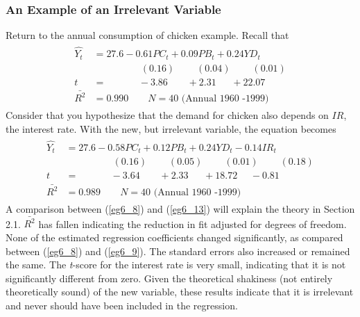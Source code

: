 \documentclass[11pt]{article}
\begin{document}
\subsubsection{An Example of an Irrelevant Variable}
Return to the annual consumption of chicken example. Recall that
\begin{align*}
\begin{split}
\hat{Y_t} &= 27.6 - {0.61PC_t} + {0.09PB_t} + {0.24YD_t}\\
&\>\>\>\>\>\>\>\>\>\>\>\>\>\>\>\>\>\>\>\>\>\> (0.16) 
\>\>\>\>\>\>\>\>\>\> (0.04)
\>\>\>\>\>\>\>\>\>\> (0.01)\\
t&=\>\>\>\>\>\>\>\>\>\>\>\>\>\>\> -3.86 
\>\>\>\>\>\>\>\>\> +2.31
\>\>\>\>\>\>\> +22.07\\
\bar{R^2}&= 0.990 \quad\quad N=40 \text{  (Annual 1960 -1999)}
\end{split}
\end{align*}
Consider that you hypothesize that the demand for chicken also depends on $IR$, the interest rate. With the new, but irrelevant variable, the equation becomes
\begin{align}
\label{eg6_13}
\begin{split}
\hat{Y_t} &= 27.6 - {0.58PC_t} + {0.12PB_t} + {0.24YD_t} - {0.14IR_t}\\
&\>\>\>\>\>\>\>\>\>\>\>\>\>\>\>\>\>\>\>\>\>\> (0.16) 
\>\>\>\>\>\>\>\>\>\> (0.05)
\>\>\>\>\>\>\>\>\>\> (0.01)
\>\>\>\>\>\>\>\>\>\> (0.18)\\
t&=\>\>\>\>\>\>\>\>\>\>\>\>\>\>\> -3.64 
\>\>\>\>\>\>\>\>\> +2.33
\>\>\>\>\>\>\> +18.72
\>\>\>\>\>\> -0.81\\
\bar{R^2}&= 0.989 \quad\quad N=40 \text{  (Annual 1960 -1999)}
\end{split}
\end{align}
A comparison between (\ref{eg6_8}) and (\ref{eg6_13}) will explain the theory in Section 2.1. $\bar{R^2}$ has fallen indicating the reduction in fit adjusted for degrees of freedom. None of the estimated regression coefficients changed significantly, as compared between (\ref{eg6_8}) and (\ref{eg6_9}).  The standard errors also increased or remained the same. The \textit{t}-score for the interest rate is very small, indicating that it is not significantly different from zero. Given the theoretical shakiness (not entirely theoretically sound) of the new variable, these results indicate that it is irrelevant and never should have been included in the regression. 
\end{document}

